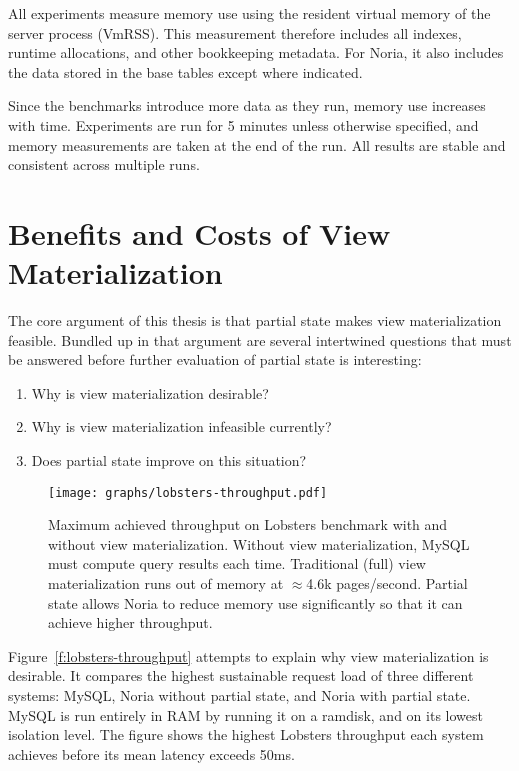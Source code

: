 All experiments measure memory use using the resident virtual memory of the
server process (VmRSS). This measurement therefore includes all indexes, runtime
allocations, and other bookkeeping metadata. For Noria, it also includes the
data stored in the base tables except where indicated.

Since the benchmarks introduce more data as they run, memory use increases with
time. Experiments are run for 5 minutes unless otherwise specified, and memory
measurements are taken at the end of the run. All results are stable and
consistent across multiple runs.

\section{Benefits and Costs of View Materialization}
\label{s:eval:why}

The core argument of this thesis is that partial state makes view
materialization feasible. Bundled up in that argument are several intertwined
questions that must be answered before further evaluation of partial state is
interesting:

\begin{enumerate}
    \item Why is view materialization desirable?
    \item Why is view materialization infeasible currently?
    \item Does partial state improve on this situation?
\end{enumerate}

\begin{figure}[h]
  \centering
  \texttt{[image: graphs/lobsters-throughput.pdf]}
  \caption{Maximum achieved throughput on Lobsters benchmark with and without
  view materialization. Without view materialization, MySQL must compute query
  results each time. Traditional (full) view materialization runs out of memory
  at $\approx$4.6k pages/second. Partial state allows Noria to reduce memory use
  significantly so that it can achieve higher throughput.}
  \label{f:lobsters-throughput}
\end{figure}

Figure~\vref{f:lobsters-throughput} attempts to explain why view materialization
is desirable. It compares the highest sustainable request load of three
different systems: MySQL, Noria without partial state, and Noria with partial
state. MySQL is run entirely in RAM by running it on a ramdisk, and on its
lowest isolation level. The figure shows the highest Lobsters throughput each
system achieves before its mean latency exceeds 50ms.

